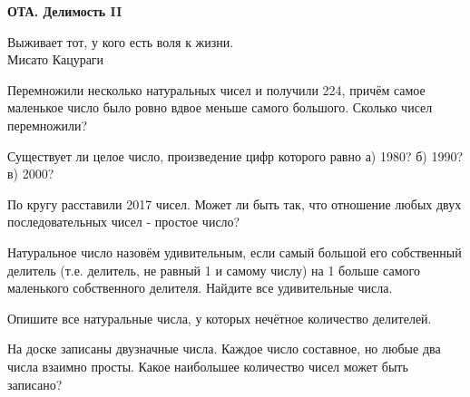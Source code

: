 \centerline{\bf \Huge ОТА. Делимость II}

\begin{flushright}
        \scriptsize{Выживает тот, у кого есть воля к жизни.\\ Мисато Кацураги}
\end{flushright}

Перемножили несколько натуральных чисел и получили 224, причём самое маленькое число было ровно вдвое меньше самого большого. Сколько чисел перемножили?

Существует ли целое число, произведение цифр которого равно  а) 1980?  б) 1990?  в) 2000?

По кругу расставили 2017 чисел. Может ли быть так, что отношение любых двух последовательных чисел - простое число?

Натуральное число назовём удивительным, если самый большой его собственный делитель (т.е. делитель, не равный 1 и самому числу) на 1 больше самого маленького собственного делителя. Найдите все удивительные числа.

Опишите все натуральные числа, у которых нечётное количество делителей.

На доске записаны двузначные числа. Каждое число составное, но любые два числа взаимно просты. Какое наибольшее количество чисел может быть записано?
